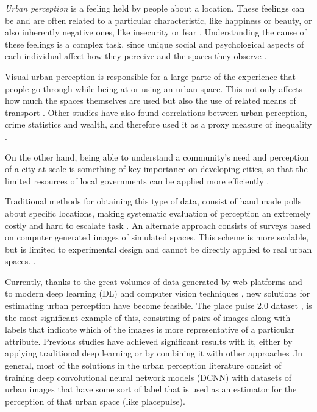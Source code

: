 \textit{Urban perception} is a feeling held by people about a location. These feelings can be and
are often related to a particular characteristic, like happiness or beauty, or also
inherently negative ones, like insecurity or fear \cite{tamara_judgments}. Understanding the
cause of these feelings is a complex task, since unique social and psychological aspects
of each individual affect how they perceive and the spaces they observe \cite{nasar_perception}.

Visual urban perception is  responsible for a large parte of the experience that people
go through while  being at or using an urban space. This not only affects how much the spaces
themselves are used \cite{khisty} but also the use of related means of transport \cite{antonakos}.
Other studies have also found correlations between urban perception, crime statistics \cite{tamara_judgments}
and wealth, and therefore used it as a proxy measure of inequality \cite{tamara_judgments,hidalgo_inequality, rossetti}.

On the other hand, being able to understand a community's need and perception of a city at scale is something
of key importance on developing cities, so that the limited  resources of local governments can be applied
more efficiently \cite{santani}.

Traditional methods for obtaining this type of data, consist of hand made polls
about specific locations, making systematic evaluation of perception  an extremely costly and hard
to escalate task \cite{nasar_perception,clifton}. An alternate approach consists of surveys based on
computer generated images of simulated spaces. This scheme is more scalable, but is limited to experimental
design and cannot be directly applied to real urban spaces. \cite{lain_grenspace,iglesias_perception}.

Currently, thanks to the great volumes of data generated by web platforms \cite{hidalgo_inequality}
and to modern deep learning (DL) and computer vision techniques \cite{lecun_dl}, new solutions for
estimating urban perception have become feasible. The place pulse 2.0 dataset \cite{hidalgo_placepulse},
is the most significant example of this, consisting of pairs of images
along with labels that indicate which of the images is more representative of a particular attribute.
Previous studies have achieved significant results with it, either by applying traditional deep learning \cite{hidalgo_placepulse}
or by combining it with other approaches \cite{rossetti, zhang_measuring}.In general, most of the solutions
in the urban perception literature consist of training deep convolutional neural network models (DCNN)
\cite{lecun_mnist} with datasets of urban images that have some sort of label that is used
as an estimator for the perception of that urban space (like placepulse).


